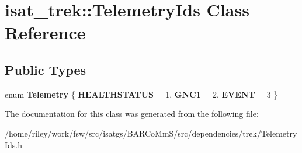 \hypertarget{classisat__trek_1_1_telemetry_ids}{}\section{isat\+\_\+trek\+:\+:Telemetry\+Ids Class Reference}
\label{classisat__trek_1_1_telemetry_ids}
\subsection*{Public Types}
\begin{DoxyCompactItemize}
\item 
enum {\bfseries Telemetry} \{ {\bfseries H\+E\+A\+L\+T\+H\+S\+T\+A\+T\+US} = 1, 
{\bfseries G\+N\+C1} = 2, 
{\bfseries E\+V\+E\+NT} = 3
 \}\hypertarget{classisat__trek_1_1_telemetry_ids_aa90d3666b414108991b7c2801648c5eb}{}\label{classisat__trek_1_1_telemetry_ids_aa90d3666b414108991b7c2801648c5eb}

\end{DoxyCompactItemize}


The documentation for this class was generated from the following file\+:\begin{DoxyCompactItemize}
\item 
/home/riley/work/fsw/src/isatgs/\+B\+A\+R\+Co\+Mm\+S/src/dependencies/trek/Telemetry\+Ids.\+h\end{DoxyCompactItemize}
